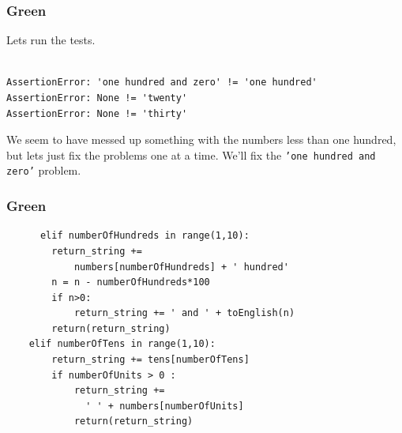 \documentclass{beamer}
\begin{document}
\begin{frame}[fragile]
\frametitle{Green}
Lets run the tests.
\begin{verbatim}

AssertionError: 'one hundred and zero' != 'one hundred'
AssertionError: None != 'twenty'
AssertionError: None != 'thirty'
\end{verbatim}
We seem to have messed up something with the numbers less than one
hundred, but lets just fix the problems one at a time. We'll fix the
{\tt 'one hundred and zero'} problem.
\end{frame}
%
\begin{frame}[fragile]
\frametitle{Green}

\begin{lstlisting}
      elif numberOfHundreds in range(1,10):
        return_string += 
            numbers[numberOfHundreds] + ' hundred'
        n = n - numberOfHundreds*100
        if n>0:
            return_string += ' and ' + toEnglish(n)
        return(return_string)
    elif numberOfTens in range(1,10):
        return_string += tens[numberOfTens]
        if numberOfUnits > 0 :
            return_string += 
              ' ' + numbers[numberOfUnits]
            return(return_string)
\end{lstlisting}
\end{frame}
\end{document}
